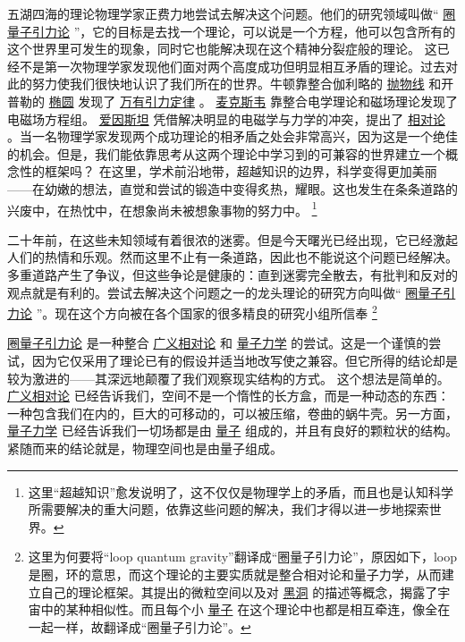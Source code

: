     五湖四海的理论物理学家正费力地尝试去解决这个问题。他们的研究领域叫做“
\href{http://toyhouse.cc/wiki/index.php/圈量子引力论}{圈量子引力论}
”，它的目标是去找一个理论，可以说是一个方程，他可以包含所有的这个世界里可发生的现象，同时它也能解决现在这个精神分裂症般的理论。
    这已经不是第一次物理学家发现他们面对两个高度成功但明显相互矛盾的理论。过去对此的努力使我们很快地认识了我们所在的世界。牛顿靠整合伽利略的
\href{http://toyhouse.cc/wiki/index.php/抛物线}{抛物线}
和开普勒的
\href{http://toyhouse.cc/wiki/index.php/椭圆}{椭圆}
发现了
\href{http://toyhouse.cc/wiki/index.php/万有引力定律}{万有引力定律}
。
\href{http://toyhouse.cc/wiki/index.php/麦克斯韦}{麦克斯韦}
靠整合电学理论和磁场理论发现了电磁场方程组。
\href{http://toyhouse.cc/wiki/index.php/爱因斯坦}{爱因斯坦}
凭借解决明显的电磁学与力学的冲突，提出了
\href{http://toyhouse.cc/wiki/index.php/相对论}{相对论}
。当一名物理学家发现两个成功理论的相矛盾之处会非常高兴，因为这是一个绝佳的机会。但是，我们能依靠思考从这两个理论中学习到的可兼容的世界建立一个概念性的框架吗？
    在这里，学术前沿地带，超越知识的边界，科学变得更加美丽——在幼嫩的想法，直觉和尝试的锻造中变得炙热，耀眼。这也发生在条条道路的兴废中，在热忱中，在想象尚未被想象事物的努力中。
\footnote[2]
{ 
这里“超越知识”愈发说明了，这不仅仅是物理学上的矛盾，而且也是认知科学所需要解决的重大问题，依靠这些问题的解决，我们才得以进一步地探索世界。
}

    二十年前，在这些未知领域有着很浓的迷雾。但是今天曙光已经出现，它已经激起人们的热情和乐观。然而这里不止有一条道路，因此也不能说这个问题已经解决。多重道路产生了争议，但这些争论是健康的：直到迷雾完全散去，有批判和反对的观点就是有利的。尝试去解决这个问题之一的龙头理论的研究方向叫做“
\href{http://toyhouse.cc/wiki/index.php/圈量子引力论}{圈量子引力论}
”。现在这个方向被在各个国家的很多精良的研究小组所信奉
\footnote[3]
{ 
这里为何要将“loop quantum gravity”翻译成“圈量子引力论”，原因如下，loop 是圈，环的意思，而这个理论的主要实质就是整合相对论和量子力学，从而建立自己的理论框架。其提出的微粒空间以及对
\href{http://toyhouse.cc/wiki/index.php/黑洞}{黑洞}
的描述等概念，揭露了宇宙中的某种相似性。而且每个小
\href{http://toyhouse.cc/wiki/index.php/量子}{量子}
在这个理论中也都是相互牵连，像全在一起一样，故翻译成“圈量子引力论”。
}


    
\href{http://toyhouse.cc/wiki/index.php/圈量子引力论}{圈量子引力论}
是一种整合
\href{http://toyhouse.cc/wiki/index.php/广义相对论}{广义相对论}
和
\href{http://toyhouse.cc/wiki/index.php/量子力学}{量子力学}
的尝试。这是一个谨慎的尝试，因为它仅采用了理论已有的假设并适当地改写使之兼容。但它所得的结论却是较为激进的——其深远地颠覆了我们观察现实结构的方式。
    这个想法是简单的。
\href{http://toyhouse.cc/wiki/index.php/广义相对论}{广义相对论}
已经告诉我们，空间不是一个惰性的长方盒，而是一种动态的东西：一种包含我们在内的，巨大的可移动的，可以被压缩，卷曲的蜗牛壳。另一方面，
\href{http://toyhouse.cc/wiki/index.php/量子力学}{量子力学}
已经告诉我们一切场都是由
\href{http://toyhouse.cc/wiki/index.php/量子}{量子}
组成的，并且有良好的颗粒状的结构。紧随而来的结论就是，物理空间也是由量子组成。


